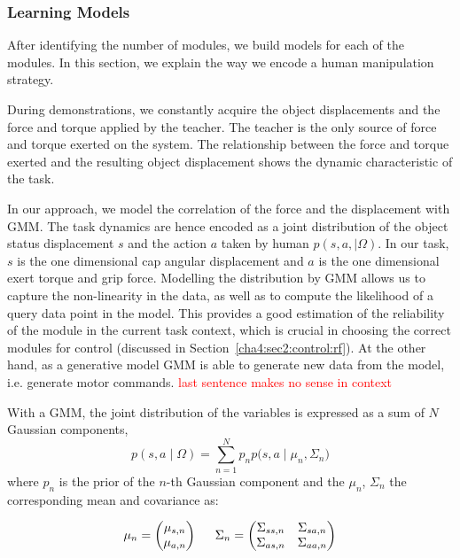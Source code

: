\subsubsection{Learning Models}
\label{cha4:sec2:learn:model}

After identifying the number of modules, we build models for each of the modules. In this section, we explain the way we encode a human manipulation strategy.

During demonstrations, we constantly acquire the object displacements and the force and torque applied by the teacher. The teacher is the only source of force and torque exerted on the system. The relationship between the force and torque exerted and the resulting object displacement shows the dynamic characteristic of the task.

In our approach, we model the correlation of the force and the displacement with GMM. The task dynamics are hence encoded as a joint distribution of the object status displacement $s$ and the action $a$ taken by human $p(s,a,{\mid}{\Omega})$. In our task, $s$ is the one dimensional cap angular displacement and $a$ is the one dimensional exert torque and grip force.
Modelling the distribution by GMM allows us to capture the non-linearity in the data, as well as to compute the likelihood of a query data point in the model. This provides a good estimation of the reliability of the module in the current task context, which is crucial in choosing the correct modules for control (discussed in Section~\ref{cha4:sec2:control:rf}). At the other hand, as a generative model GMM is able to generate new data from the model, i.e. generate motor commands. \textcolor{red}{last sentence makes no sense in context}

With a GMM, the joint distribution of the variables is expressed as a sum of $N$ Gaussian components,
\begin{equation}
{
p(s,a\mid\Omega)
= \sum_{n=1}^N {p_{n}p(s,a\mid{\mu}_n},{\Sigma}_n)
}
\end{equation}
where $p_n$ is the prior of the $n$-th Gaussian component and the ${\mu}_n$, ${\Sigma}_n$ the corresponding mean and covariance as:

\begin{equation}
{
{\mu}_n = \begin{pmatrix}    {\mu}_{s,n}     \\
                             {\mu}_{a,n}          \\
                    \end{pmatrix}
\hspace{0.2in}
{\Sigma}_n = \begin{pmatrix}     {\Sigma}_{ss,n}  &
                                 {\Sigma}_{sa,n} \\
                                 {\Sigma}_{as,n}  &
                                 {\Sigma}_{aa,n}   \\

                        \end{pmatrix}
}
\end{equation}

